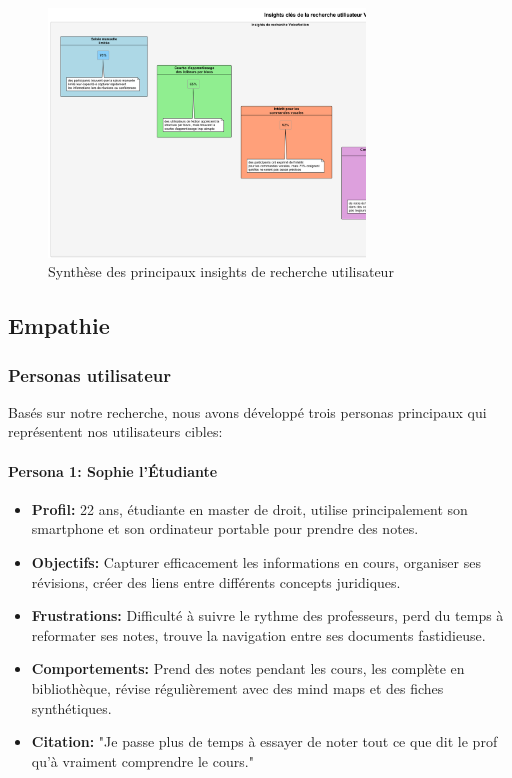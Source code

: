 \begin{figure}[H]
    \centering
    \includegraphics[width=0.75\textwidth]{assets/docs/user_research_insights.png}
    \caption{Synthèse des principaux insights de recherche utilisateur}
    \label{fig:user_research_insights}
\end{figure}

\subsection{Empathie}

\subsubsection{Personas utilisateur}

Basés sur notre recherche, nous avons développé trois personas principaux qui représentent nos utilisateurs cibles:

\paragraph{Persona 1: Sophie l'Étudiante}

\begin{itemize}
    \item \textbf{Profil:} 22 ans, étudiante en master de droit, utilise principalement son smartphone et son ordinateur portable pour prendre des notes.
    \item \textbf{Objectifs:} Capturer efficacement les informations en cours, organiser ses révisions, créer des liens entre différents concepts juridiques.
    \item \textbf{Frustrations:} Difficulté à suivre le rythme des professeurs, perd du temps à reformater ses notes, trouve la navigation entre ses documents fastidieuse.
    \item \textbf{Comportements:} Prend des notes pendant les cours, les complète en bibliothèque, révise régulièrement avec des mind maps et des fiches synthétiques.
    \item \textbf{Citation:} "Je passe plus de temps à essayer de noter tout ce que dit le prof qu'à vraiment comprendre le cours."
\end{itemize}

